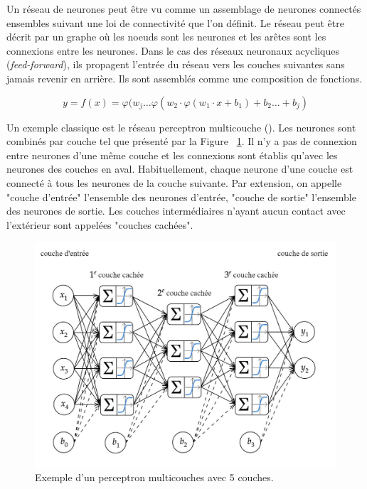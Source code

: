 Un réseau de neurones peut être vu comme un assemblage de neurones connectés ensembles suivant une loi de connectivité que l'on définit. Le réseau peut être décrit par un graphe où les noeuds sont les neurones et les arêtes sont les connexions entre les neurones. Dans le cas des réseaux neuronaux acycliques (\textit{feed-forward}), ils propagent l’entrée du réseau vers les couches suivantes sans jamais revenir en arrière. Ils sont assemblés comme une composition de fonctions.

\begin{equation}
    y = f(x) =  \varphi(w_j \dots \varphi(w_2 \cdot \varphi(w_1 \cdot x+b_1)+b_2 \dots + b_j)
\end{equation}

Un exemple classique est le réseau perceptron multicouche (\acrmlpns). Les neurones sont combinés par couche tel que présenté par la Figure ~\ref{fig:reseau_neurones_artificiels}. Il n'y a pas de connexion entre neurones d'une même couche et les connexions sont établis qu'avec les neurones des couches en aval. Habituellement, chaque neurone d'une couche est connecté à tous les neurones de la couche suivante.  Par extension, on appelle "couche d'entrée" l'ensemble des neurones d'entrée, "couche de sortie" l'ensemble des neurones de sortie. Les couches intermédiaires n'ayant aucun contact avec l'extérieur sont appelées "couches cachées".

\begin{figure}[!htbp] 
  \includegraphics[width=0.85\linewidth]{figures/Chap2/perceptron-diagram.jpg}
  \centering
  \caption{\small{Exemple d'un perceptron multicouches avec 5 couches. }}
  \label{fig:reseau_neurones_artificiels}
\end{figure}

